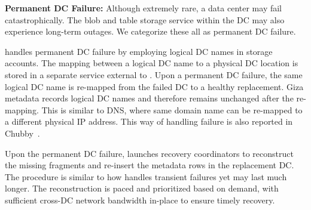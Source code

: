 
{\bf Permanent DC Failure:}
Although extremely rare, a data center may fail catastrophically. The blob and
table storage service within the DC may also experience long-term outages. We
categorize these all as permanent DC failure. 

\name handles permanent DC failure by employing logical DC names in storage accounts. The mapping between a logical DC name to a physical DC location is stored in a separate service external to \name. Upon a permanent DC failure, the same logical DC name is re-mapped from the failed DC to a healthy replacement. Giza metadata records logical DC names and therefore remains unchanged after the re-mapping. This is similar to DNS, where same domain name can be re-mapped to a different physical IP address. This way of handling failure is also reported in Chubby~\cite{chubby:osdi06}.

Upon the permanent DC failure, \name launches recovery coordinators to reconstruct the missing fragments and re-insert the metadata rows in the replacement DC. The procedure is similar to how \name handles transient failures yet may last much longer. The reconstruction is paced and prioritized based on demand, with sufficient cross-DC network bandwidth in-place to ensure timely recovery.




